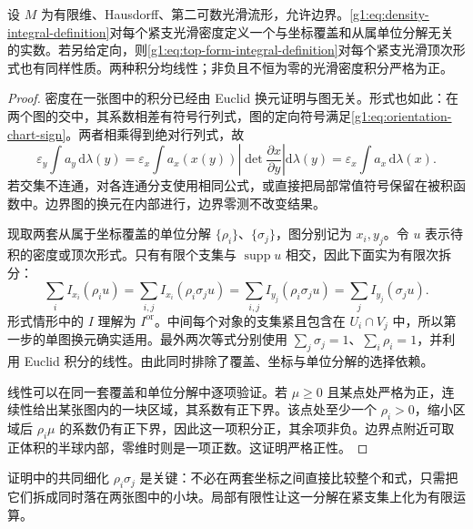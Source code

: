 \begin{theorem}
	\label{g1:thm:integral-well-defined}
	设 \(M\) 为有限维、Hausdorff、第二可数光滑流形，允许边界。\eqref{g1:eq:density-integral-definition}对每个紧支光滑密度定义一个与坐标覆盖和从属单位分解无关的实数。若另给定向，则\eqref{g1:eq:top-form-integral-definition}对每个紧支光滑顶次形式也有同样性质。两种积分均线性；非负且不恒为零的光滑密度积分严格为正。
\end{theorem}
\begin{proof}
	密度在一张图中的积分已经由 Euclid 换元证明与图无关。形式也如此：在两个图的交中，其系数相差有符号行列式，图的定向符号满足\eqref{g1:eq:orientation-chart-sign}。两者相乘得到绝对行列式，故
	\[
		\varepsilon_y\int a_y\,\mathrm{d}\lambda(y)
		=\varepsilon_x\int a_x(x(y))\left|\det\frac{\partial x}{\partial y}\right|\mathrm{d}\lambda(y)
		=\varepsilon_x\int a_x\,\mathrm{d}\lambda(x).
	\]
	若交集不连通，对各连通分支使用相同公式，或直接把局部常值符号保留在被积函数中。边界图的换元在内部进行，边界零测不改变结果。

	现取两套从属于坐标覆盖的单位分解 \(\{\rho_i\}\)、\(\{\sigma_j\}\)，图分别记为 \(x_i,y_j\)。令 \(u\) 表示待积的密度或顶次形式。只有有限个支集与 \(\operatorname{supp}u\) 相交，因此下面实为有限次拆分：
	\[
		\sum_i I_{x_i}(\rho_i u)
		=\sum_{i,j}I_{x_i}(\rho_i\sigma_j u)
		=\sum_{i,j}I_{y_j}(\rho_i\sigma_j u)
		=\sum_j I_{y_j}(\sigma_j u).
	\]
	形式情形中的 \(I\) 理解为 \(I^{\mathrm{or}}\)。中间每个对象的支集紧且包含在 \(U_i\cap V_j\) 中，所以第一步的单图换元确实适用。最外两次等式分别使用 \(\sum_j\sigma_j=1\)、\(\sum_i\rho_i=1\)，并利用 Euclid 积分的线性。由此同时排除了覆盖、坐标与单位分解的选择依赖。

	线性可以在同一套覆盖和单位分解中逐项验证。若 \(\mu\geq0\) 且某点处严格为正，连续性给出某张图内的一块区域，其系数有正下界。该点处至少一个 \(\rho_i>0\)，缩小区域后 \(\rho_i\mu\) 的系数仍有正下界，因此这一项积分正，其余项非负。边界点附近可取正体积的半球内部，零维时则是一项正数。这证明严格正性。
\end{proof}

证明中的共同细化 \(\rho_i\sigma_j\) 是关键：不必在两套坐标之间直接比较整个和式，只需把它们拆成同时落在两张图中的小块。局部有限性让这一分解在紧支集上化为有限运算。

